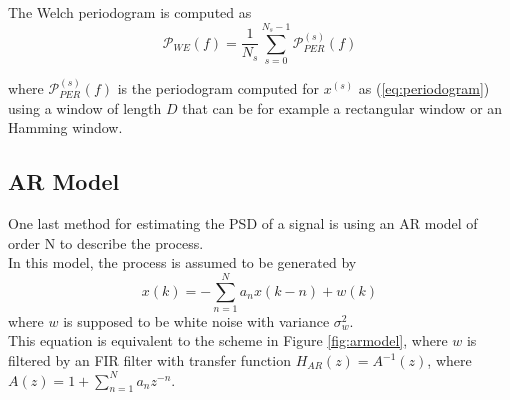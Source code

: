 \documentclass[a4paper, 12pt]{report}
\begin{document}
The Welch periodogram is computed as
\begin{equation}
\mathcal{P}_{WE}(f) = \frac{1}{N_s}\sum_{s=0}^{N_s-1}{\mathcal{P}}_{PER}^{(s)}(f)
\end{equation}

where ${\mathcal{P}}_{PER}^{(s)}(f)$ is the periodogram computed for $x^{(s)}$ as (\ref{eq:periodogram}) using a window of length $D$ that can be for example a rectangular window or an Hamming window.

\subsection*{AR Model}
One last method for estimating the PSD of a signal is using an AR model of order N to describe the process.\\
In this model, the process is assumed to be generated by
\begin{equation}
	x(k) = - \sum_{n=1}^N a_n x(k-n) + w(k)
\end{equation}
where $w$ is supposed to be white noise with variance $\sigma_w^2$.\\
This equation is equivalent to the scheme in Figure \ref{fig:armodel}, where $w$ is filtered by an FIR filter with transfer function $H_{AR}(z) = A^{-1}(z)$, where $A(z) = 1 + \sum_{n=1}^N a_n z^{-n}$.
\end{document}
